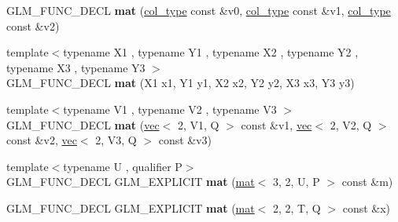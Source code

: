 \begin{DoxyCompactItemize}
\item 
\mbox{\label{structglm_1_1mat_3_013_00_012_00_01T_00_01Q_01_4_a0afeb0736f839688e1bb3bae525d7b9f}} 
G\+L\+M\+\_\+\+F\+U\+N\+C\+\_\+\+D\+E\+CL {\bfseries mat} (\hyperlink{structglm_1_1vec_3_012_00_01T_00_01Q_01_4}{col\+\_\+type} const \&v0, \hyperlink{structglm_1_1vec_3_012_00_01T_00_01Q_01_4}{col\+\_\+type} const \&v1, \hyperlink{structglm_1_1vec_3_012_00_01T_00_01Q_01_4}{col\+\_\+type} const \&v2)
\item 
\mbox{\label{structglm_1_1mat_3_013_00_012_00_01T_00_01Q_01_4_a3c26b5b95edc507ae5df2f129cef4f55}} 
{\footnotesize template$<$typename X1 , typename Y1 , typename X2 , typename Y2 , typename X3 , typename Y3 $>$ }\\G\+L\+M\+\_\+\+F\+U\+N\+C\+\_\+\+D\+E\+CL {\bfseries mat} (X1 x1, Y1 y1, X2 x2, Y2 y2, X3 x3, Y3 y3)
\item 
\mbox{\label{structglm_1_1mat_3_013_00_012_00_01T_00_01Q_01_4_a6cb6451f917beacf232481507a5aab49}} 
{\footnotesize template$<$typename V1 , typename V2 , typename V3 $>$ }\\G\+L\+M\+\_\+\+F\+U\+N\+C\+\_\+\+D\+E\+CL {\bfseries mat} (\hyperlink{structglm_1_1vec}{vec}$<$ 2, V1, Q $>$ const \&v1, \hyperlink{structglm_1_1vec}{vec}$<$ 2, V2, Q $>$ const \&v2, \hyperlink{structglm_1_1vec}{vec}$<$ 2, V3, Q $>$ const \&v3)
\item 
\mbox{\label{structglm_1_1mat_3_013_00_012_00_01T_00_01Q_01_4_a00a95509600f8cd29b1b27c6c585ae09}} 
{\footnotesize template$<$typename U , qualifier P$>$ }\\G\+L\+M\+\_\+\+F\+U\+N\+C\+\_\+\+D\+E\+CL G\+L\+M\+\_\+\+E\+X\+P\+L\+I\+C\+IT {\bfseries mat} (\hyperlink{structglm_1_1mat}{mat}$<$ 3, 2, U, P $>$ const \&m)
\item 
\mbox{\label{structglm_1_1mat_3_013_00_012_00_01T_00_01Q_01_4_a33b5af5c23e362b31299d4bc37a8df00}} 
G\+L\+M\+\_\+\+F\+U\+N\+C\+\_\+\+D\+E\+CL G\+L\+M\+\_\+\+E\+X\+P\+L\+I\+C\+IT {\bfseries mat} (\hyperlink{structglm_1_1mat}{mat}$<$ 2, 2, T, Q $>$ const \&x)
\item 
\mbox{\label{structglm_1_1mat_3_013_00_012_00_01T_00_01Q_01_4_a8ef842a296f1ebaf74ea0f67adb42395}} 

\end{DoxyCompactItemize}
